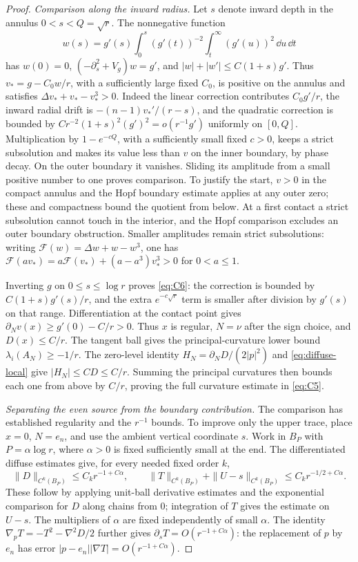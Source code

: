 \begin{proof}
\emph{Comparison along the inward radius.}
Let $s$ denote inward depth in the annulus $0<s<Q=\sqrt r$.
The nonnegative function
\[
 w(s)=g'(s)\int_0^s(g'(t))^{-2}
                    \int_t^\infty(g'(u))^2\,\dd u\,\dd t
\]
has $w(0)=0$, $(-\partial_s^2+V_g)w=g'$, and
$|w|+|w'|\le C(1+s)g'$.  Thus $v_*=g-C_0w/r$, with a sufficiently
large fixed $C_0$, is positive on the annulus and satisfies
$\Delta v_*+v_*-v_*^3>0$.  Indeed the linear correction contributes
$C_0g'/r$, the inward radial drift is
$-(n-1)v_*'/(r-s)$, and the quadratic correction is bounded by
$C r^{-2}(1+s)^2(g')^2=o(r^{-1}g')$ uniformly on $[0,Q]$.
Multiplication by $1-e^{-cQ}$, with a sufficiently small fixed
$c>0$, keeps a strict subsolution and makes its value less than $v$
on the inner boundary, by phase decay.  On the outer boundary it
vanishes.  Sliding its amplitude from a small positive number to one
proves comparison.  To justify the start, $v>0$ in the compact
annulus and the Hopf boundary estimate applies at any outer zero;
these and compactness bound the quotient from below.  At a first
contact a strict subsolution cannot touch in the interior, and the
Hopf comparison excludes an outer boundary obstruction.  Smaller
amplitudes remain strict subsolutions: writing
$\mathcal F(w)=\Delta w+w-w^3$, one has
$\mathcal F(av_*)=a\mathcal F(v_*)+(a-a^3)v_*^3>0$ for $0<a\le1$.

Inverting $g$ on $0\le s\le\log r$ proves \eqref{eq:C6}:
the correction is bounded by $C(1+s)g'(s)/r$, and the extra
$e^{-c\sqrt r}$ term is smaller after division by $g'(s)$ on that
range.  Differentiation at the contact point gives
$\partial_Nv(x)\ge g'(0)-C/r>0$.  Thus $x$ is regular, $N=\nu$
after the sign choice, and $D(x)\le C/r$.  The tangent ball gives
the principal-curvature lower bound $\lambda_i(A_N)\ge-1/r$.
The zero-level identity $H_N=\partial_ND/(2|p|^2)$ and
\eqref{eq:diffuse-local} give $|H_N|\le CD\le C/r$.
Summing the principal curvatures then bounds each one from above by
$C/r$, proving the full curvature estimate in \eqref{eq:C5}.

\emph{Separating the even source from the boundary contribution.}
The comparison has established regularity and the $r^{-1}$ bounds.
To improve only the upper trace, place $x=0$, $N=e_n$, and use the
ambient vertical coordinate $s$.  Work in $B_P$ with
$P=\alpha\log r$, where $\alpha>0$ is fixed sufficiently small at
the end.  The differentiated diffuse estimates give, for every
needed fixed order $k$,
\[
 \|D\|_{C^k(B_P)}\le C_k r^{-1+C\alpha},\qquad
 \|T\|_{C^k(B_P)}+\|U-s\|_{C^k(B_P)}
 \le C_k r^{-1/2+C\alpha}.
\]
These follow by applying unit-ball derivative estimates and the
exponential comparison for $D$ along chains from $0$; integration
of $T$ gives the estimate on $U-s$.  The multipliers of $\alpha$
are fixed independently of small $\alpha$.  The identity
$\nabla_pT=-T^2-\nabla^2D/2$ further gives
$\partial_sT=O(r^{-1+C\alpha})$: the replacement of $p$ by $e_n$
has error $|p-e_n||\nabla T|=O(r^{-1+C\alpha})$.


\end{proof}
